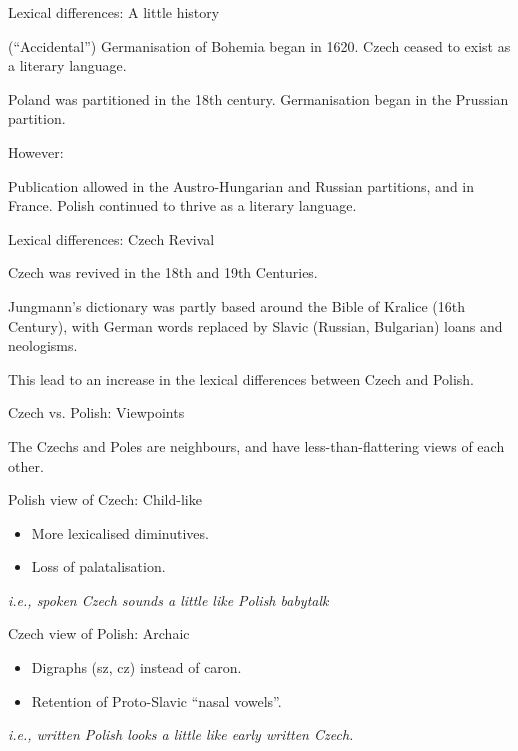 \documentclass{beamer}
\begin{document}
\begin{frame}{Lexical differences: A little history}

(``Accidental'') Germanisation of Bohemia began in 1620. Czech ceased to exist as a literary language.

Poland was partitioned in the 18th century. Germanisation began in the Prussian partition.

However: 

Publication allowed in the Austro-Hungarian and Russian partitions, and in France. 
Polish continued to thrive as a literary language.

\end{frame}

\begin{frame}{Lexical differences: Czech Revival}

Czech was revived in the 18th and 19th Centuries.

Jungmann's dictionary was partly based around the Bible of Kralice (16th Century),
with German words replaced by Slavic (Russian, Bulgarian) loans and neologisms.

This lead to an increase in the lexical differences between Czech and Polish.

\end{frame}

\begin{frame}{Czech vs. Polish: Viewpoints}

\begin{center}
The Czechs and Poles are neighbours, and have less-than-flattering
views of each other.
\end{center}

Polish view of Czech: Child-like

\begin{itemize}
\item More lexicalised diminutives.
\item Loss of palatalisation.
\end{itemize}

{\it\small i.e., spoken Czech sounds a little like Polish babytalk}

Czech view of Polish: Archaic

\begin{itemize}
\item Digraphs (sz, cz) instead of caron.
\item Retention of Proto-Slavic ``nasal vowels''.
\end{itemize}

{\it\small i.e., written Polish looks a little like early written Czech.}
\end{frame}
\end{document}

